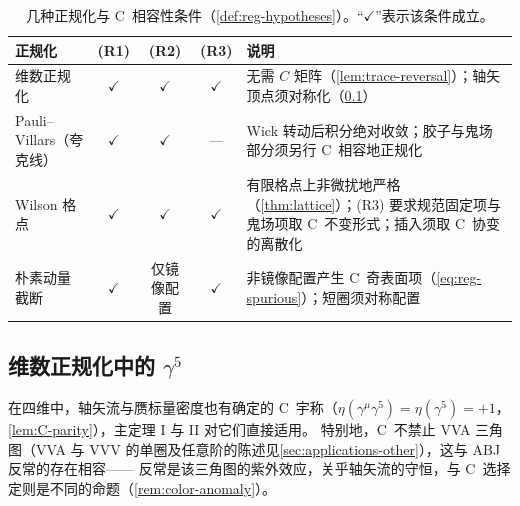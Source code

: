 \documentclass[UTF8,a4paper,11pt,fontset=fandol]{ctexart}
\theoremstyle{cplain}
\theoremstyle{cdefinition}
\theoremstyle{cremark}
\numberwithin{equation}{section}
\begin{document}
\begin{table}[htbp]
\centering
\caption{几种正规化与 C~相容性条件（\cref{def:reg-hypotheses}）。“$\checkmark$”表示该条件成立。}
\label{tab:reg-schemes}
\small
\renewcommand{\arraystretch}{1.2}
\begin{tabularx}{\textwidth}{@{}l c c c >{\raggedright\arraybackslash}X@{}}
\toprule
正规化 & (R1) & (R2) & (R3) & 说明 \\
\midrule
维数正规化 & $\checkmark$ & $\checkmark$ & $\checkmark$ & 无需 $C$ 矩阵（\cref{lem:trace-reversal}）；轴矢顶点须对称化（\cref{sec:reg-gamma5}）\\
Pauli--Villars（夸克线） & $\checkmark$ & $\checkmark$ & --- & Wick 转动后积分绝对收敛；胶子与鬼场部分须另行 C~相容地正规化\\
Wilson 格点 & $\checkmark$ & $\checkmark$ & $\checkmark$ & 有限格点上非微扰地严格（\cref{thm:lattice}）；(R3) 要求规范固定项与鬼场项取 C~不变形式；插入须取 C~协变的离散化\\
朴素动量截断 & $\checkmark$ & 仅镜像配置 & $\checkmark$ & 非镜像配置产生 C~奇表面项（\cref{eq:reg-spurious}）；短圈须对称配置\\
\bottomrule
\end{tabularx}
\end{table}

\subsection{维数正规化中的 \texorpdfstring{$\gamma^5$}{γ5}}\label{sec:reg-gamma5}

在四维中，轴矢流与赝标量密度也有确定的 C~宇称（$\eta(\gamma^\mu\gamma^5)=\eta(\gamma^5)=+1$，\cref{lem:C-parity}），主定理 I 与 II 对它们直接适用。
特别地，C~不禁止 VVA 三角图（VVA 与 VVV 的单圈及任意阶的陈述见\cref{sec:applications-other}），这与 ABJ 反常的存在相容——
反常是该三角图的紫外效应，关乎轴矢流的守恒，与 C~选择定则是不同的命题（\cref{rem:color-anomaly}）。
\end{document}
